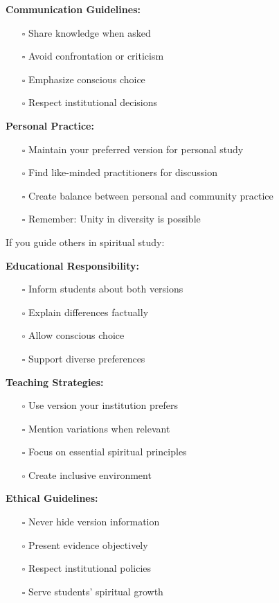 \documentclass[12pt,twoside]{book}
\begin{document}
\textbf{\textbf{Communication Guidelines:}}
\begin{itemize}
\item[{$\square$}] Share knowledge when asked
\item[{$\square$}] Avoid confrontation or criticism
\item[{$\square$}] Emphasize conscious choice
\item[{$\square$}] Respect institutional decisions
\end{itemize}

\textbf{\textbf{Personal Practice:}}
\begin{itemize}
\item[{$\square$}] Maintain your preferred version for personal study
\item[{$\square$}] Find like-minded practitioners for discussion
\item[{$\square$}] Create balance between personal and community practice
\item[{$\square$}] Remember: Unity in diversity is possible
\end{itemize}

If you guide others in spiritual study:

\textbf{\textbf{Educational Responsibility:}}
\begin{itemize}
\item[{$\square$}] Inform students about both versions
\item[{$\square$}] Explain differences factually
\item[{$\square$}] Allow conscious choice
\item[{$\square$}] Support diverse preferences
\end{itemize}

\textbf{\textbf{Teaching Strategies:}}
\begin{itemize}
\item[{$\square$}] Use version your institution prefers
\item[{$\square$}] Mention variations when relevant
\item[{$\square$}] Focus on essential spiritual principles
\item[{$\square$}] Create inclusive environment
\end{itemize}

\textbf{\textbf{Ethical Guidelines:}}
\begin{itemize}
\item[{$\square$}] Never hide version information
\item[{$\square$}] Present evidence objectively
\item[{$\square$}] Respect institutional policies
\item[{$\square$}] Serve students' spiritual growth
\end{itemize}
\end{document}
